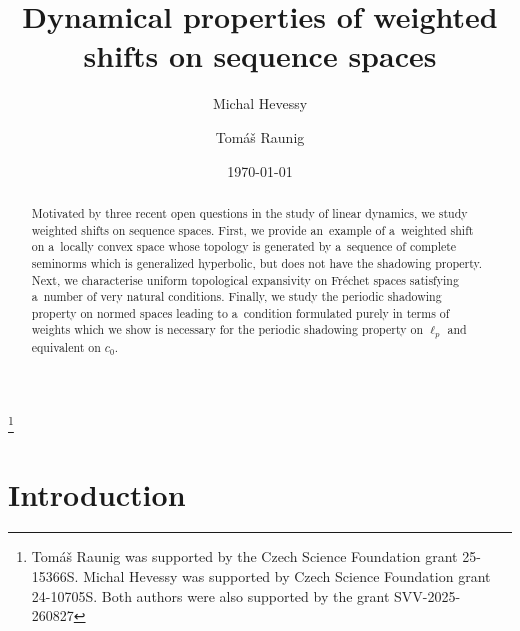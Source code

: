 \documentclass[11pt,a4paper]{amsart}
\theoremstyle{definition}
\begin{document}
	
	\title{Dynamical properties of weighted shifts on sequence spaces}
	
	\author[Hevessy]{Michal Hevessy}
	\address[Hevessy]{Faculty of Mathematics and Physics, Charles University, Sokolovská 83, Prague, 186 00 \newline
		\href{https://orcid.org/0009-0003-4192-2407}{ORCID: \texttt{0009-0003-4192-2407}}}
	
	\author[Raunig]{Tomáš Raunig}
	\address[Raunig]{Institute of Mathematics, Czech Academy of Sciences, Žitná 25, 115 67, Czech Republic\newline second address: Faculty of Mathematics and Physics, Charles University, Sokolovská 83, Prague, 186 00 \newline
		\href{https://orcid.org/0009-0001-3425-8726}{ORCID: \texttt{0009-0001-3425-8726}}}
	
	\thanks{Tomáš Raunig was supported by the  Czech Science Foundation grant 25-15366S. Michal Hevessy was supported by Czech Science Foundation grant 24-10705S. Both authors were also supported by the grant SVV-2025-260827}
	
	\date{\today}
	
	
	
	
	\begin{abstract} Motivated by three recent open questions in the study of linear dynamics, we study weighted shifts on sequence spaces. First, we provide an~example of a~weighted shift on a~locally convex space whose topology is generated by a~sequence of complete seminorms which is generalized hyperbolic, but does not have the shadowing property. Next, we characterise uniform topological expansivity on Fr\'echet spaces satisfying a~number of very natural conditions. Finally, we study the periodic shadowing property on normed spaces leading to a~condition formulated purely in terms of weights which we show is necessary for the periodic shadowing property on $\ell_p$ and equivalent on $c_0$.\end{abstract}
	
	\maketitle
	
	\section{Introduction}
	
\end{document}

